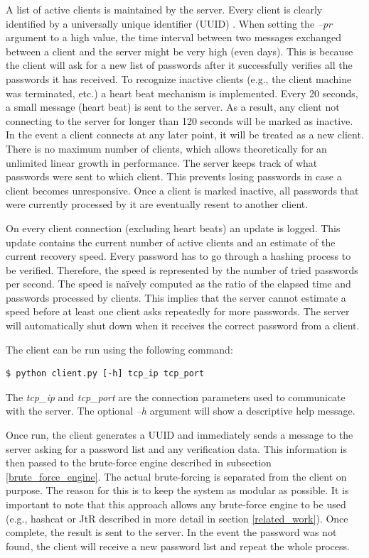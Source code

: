 \documentclass[11pt,oneside]{fithesis2}
\begin{document}
A list of active clients is maintained by the server. Every client is clearly identified by a universally unique identifier (UUID) \cite{rfc4122}. When setting the \textit{–pr} argument to a high value, the time interval between two messages exchanged between a client and the server might be very high (even days). This is because the client will ask for a new list of passwords after it successfully verifies all the passwords it has received. To recognize inactive clients (e.g., the client machine was terminated, etc.) a heart beat mechanism is implemented. Every 20 seconds, a small message (heart beat) is sent to the server. As a result, any client not connecting to the server for longer than 120 seconds will be marked as inactive. In the event a client connects at any later point, it will be treated as a new client. There is no maximum number of clients, which allows theoretically for an unlimited linear growth in performance. The server keeps track of what passwords were sent to which client. This prevents losing passwords in case a client becomes unresponsive. Once a client is marked inactive, all passwords that were currently processed by it are eventually resent to another client. 

On every client connection (excluding heart beats) an update is logged. This update contains the current number of active clients and an estimate of the current recovery speed. Every password has to go through a hashing process to be verified. Therefore, the speed is represented by the number of tried passwords per second. The speed is naïvely computed as the ratio of the elapsed time and passwords processed by clients. This implies that the server cannot estimate a speed before at least one client asks repeatedly for more passwords. The server will automatically shut down when it receives the correct password from a client.

The client can be run using the following command:
\begin{lstlisting}
$ python client.py [-h] tcp_ip tcp_port 
\end{lstlisting}

The \textit{tcp\_ip} and \textit{tcp\_port} are the connection parameters used to communicate with the server. The optional \textit{–h} argument will show a descriptive help message. 

Once run, the client generates a UUID and immediately sends a message to the server asking for a password list and any verification data. This information is then passed to the brute-force engine described in subsection \ref{brute_force_engine}. The actual brute-forcing is separated from the client on purpose. The reason for this is to keep the system as modular as possible. It is important to note that this approach allows any brute-force engine to be used (e.g., hashcat or JtR \cite{hashcat, jtr} described in more detail in section \ref{related_work}).\label{jtrhc_modular} Once complete, the result is sent to the server. In the event the password was not found, the client will receive a new password list and repeat the whole process.
\end{document}
